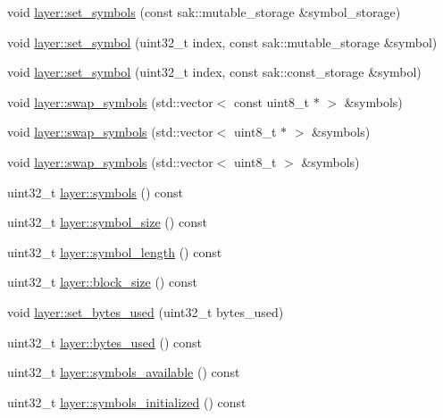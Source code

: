 \begin{DoxyCompactItemize}
\item 
void \hyperlink{group__storage__api_ga9ad55409229f2e246ea6e53712d034e4}{layer\-::set\-\_\-symbols} (const sak\-::mutable\-\_\-storage \&symbol\-\_\-storage)
\item 
void \hyperlink{group__storage__api_ga7f79fae19b4a2fd73d4c2c3c5be1ff7f}{layer\-::set\-\_\-symbol} (uint32\-\_\-t index, const sak\-::mutable\-\_\-storage \&symbol)
\item 
void \hyperlink{group__storage__api_ga220f389242643842dfb46105b5a408ff}{layer\-::set\-\_\-symbol} (uint32\-\_\-t index, const sak\-::const\-\_\-storage \&symbol)
\item 
void \hyperlink{group__storage__api_ga4bb3abcfff5167bddc7bc28b42ac2fdb}{layer\-::swap\-\_\-symbols} (std\-::vector$<$ const uint8\-\_\-t $\ast$ $>$ \&symbols)
\item 
void \hyperlink{group__storage__api_gaead1a58e30a3d8e673da29f627455efc}{layer\-::swap\-\_\-symbols} (std\-::vector$<$ uint8\-\_\-t $\ast$ $>$ \&symbols)
\item 
void \hyperlink{group__storage__api_ga647716b7e514a63b009c62ee379899eb}{layer\-::swap\-\_\-symbols} (std\-::vector$<$ uint8\-\_\-t $>$ \&symbols)
\item 
uint32\-\_\-t \hyperlink{group__storage__api_ga7636faed36a6f85c622102e69fd67c0e}{layer\-::symbols} () const 
\item 
uint32\-\_\-t \hyperlink{group__storage__api_gad0fc0dc98e10a49c81d5d08895f94656}{layer\-::symbol\-\_\-size} () const 
\item 
uint32\-\_\-t \hyperlink{group__storage__api_gad08bdab196333eac6f73e5919bc51366}{layer\-::symbol\-\_\-length} () const 
\item 
uint32\-\_\-t \hyperlink{group__storage__api_ga80ff93571c5bf00ecdfd9c216ec5ffe3}{layer\-::block\-\_\-size} () const 
\item 
void \hyperlink{group__storage__api_ga6a21be78a5ff875470f954e0b2a7bade}{layer\-::set\-\_\-bytes\-\_\-used} (uint32\-\_\-t bytes\-\_\-used)
\item 
uint32\-\_\-t \hyperlink{group__storage__api_ga69e587579d2124c13d177957777c049f}{layer\-::bytes\-\_\-used} () const 
\item 
uint32\-\_\-t \hyperlink{group__storage__api_ga00333865ea7e7f49745b81ab0cd0d3cc}{layer\-::symbols\-\_\-available} () const 
\item 
uint32\-\_\-t \hyperlink{group__storage__api_gaf7e4f0c95779060d2e4a489fbf415543}{layer\-::symbols\-\_\-initialized} () const 
\item 

\end{DoxyCompactItemize}
